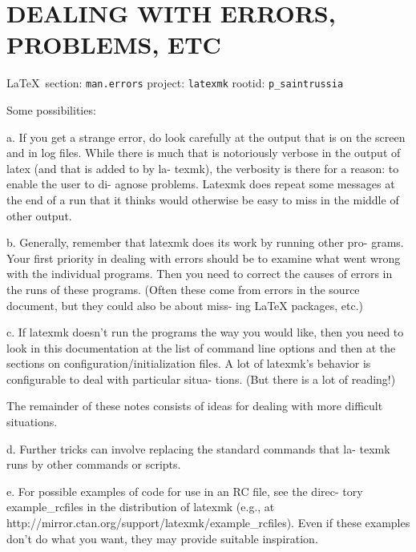  
 
\section{DEALING WITH ERRORS, PROBLEMS, ETC}
  
\vspace{0.5cm}
 {\ifDEBUG\small\LaTeX~section: \verb|man.errors| project: \verb|latexmk| rootid: \verb|p_saintrussia| \fi}
\vspace{0.5cm}
  
Some possibilities:

a. If you get a strange error, do look carefully at the output that  is
on  the  screen  and  in  log  files.   While  there  is  much  that is
notoriously verbose in the output of latex (and that is added to by la-
texmk),  the verbosity is there for a reason: to enable the user to di-
agnose problems.  Latexmk does repeat some messages at the end of a run
that  it  thinks would otherwise be easy to miss in the middle of other
output.

b. Generally, remember that latexmk does its work by running other pro-
grams.  Your first priority in dealing with errors should be to examine
what went wrong with the individual programs.  Then you need to correct
the  causes of errors in the runs of these programs.  (Often these come
from errors in the source document, but they could also be about  miss-
ing LaTeX packages, etc.)

c. If latexmk doesn't run the programs the way you would like, then you
need to look in this documentation at the list of command line  options
and  then at the sections on configuration/initialization files.  A lot
of latexmk's behavior is configurable to deal  with  particular  situa-
tions.  (But there is a lot of reading!)

The  remainder  of  these notes consists of ideas for dealing with more
difficult situations.

d. Further tricks can involve replacing the standard commands that  la-
texmk runs by other commands or scripts.

e.  For possible examples of code for use in an RC file, see the direc-
tory  example_rcfiles  in  the  distribution  of  latexmk   (e.g.,   at
http://mirror.ctan.org/support/latexmk/example_rcfiles).  Even if these
examples don't do what you want, they may provide suitable inspiration.

